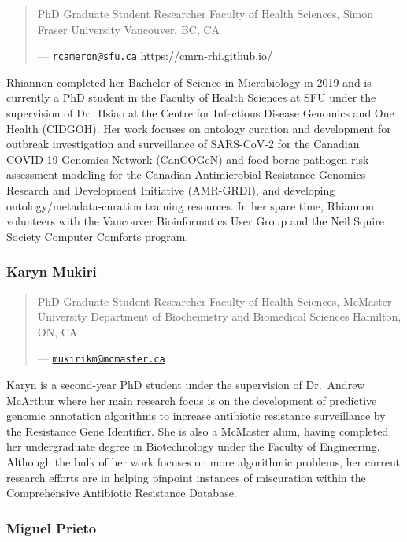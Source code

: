 \documentclass[
]{book}
\begin{document}
\begin{quote}
PhD Graduate Student Researcher
Faculty of Health Sciences, Simon Fraser University
Vancouver, BC, CA

--- \href{mailto:rcameron@sfu.ca}{\nolinkurl{rcameron@sfu.ca}}
\url{https://cmrn-rhi.github.io/}
\end{quote}

Rhiannon completed her Bachelor of Science in Microbiology in 2019 and is currently a PhD
student in the Faculty of Health Sciences at SFU under the supervision of Dr.~Hsiao at the
Centre for Infectious Disease Genomics and One Health (CIDGOH). Her work focuses on
ontology curation and development for outbreak investigation and surveillance of SARS-CoV-2
for the Canadian COVID-19 Genomics Network (CanCOGeN) and food-borne pathogen risk
assessment modeling for the Canadian Antimicrobial Resistance Genomics Research and
Development Initiative (AMR-GRDI), and developing ontology/metadata-curation training
resources. In her spare time, Rhiannon volunteers with the Vancouver Bioinformatics User
Group and the Neil Squire Society Computer Comforts program.

\subsubsection{Karyn Mukiri}\label{karyn-mukiri}

\begin{quote}
PhD Graduate Student Researcher
Faculty of Health Sciences, McMaster University
Department of Biochemistry and Biomedical Sciences
Hamilton, ON, CA

--- \href{mailto:mukirikm@mcmaster.ca}{\nolinkurl{mukirikm@mcmaster.ca}}
\end{quote}

Karyn is a second-year PhD student under the supervision of Dr.~Andrew McArthur where her
main research focus is on the development of predictive genomic annotation algorithms to
increase antibiotic resistance surveillance by the Resistance Gene Identifier. She is also a
McMaster alum, having completed her undergraduate degree in Biotechnology under the
Faculty of Engineering. Although the bulk of her work focuses on more algorithmic problems,
her current research efforts are in helping pinpoint instances of miscuration within the
Comprehensive Antibiotic Resistance Database.

\subsubsection{Miguel Prieto}\label{miguel-prieto}
\end{document}
